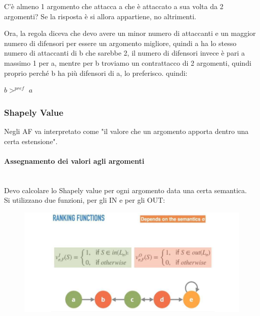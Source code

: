 \vspace{0.3cm}

\noindent C'è almeno 1 argomento che attacca a che è attaccato a sua volta
da 2 argomenti? Se la risposta è si allora appartiene, no altrimenti.

\vspace{0.3cm}

\noindent Ora, la regola diceva che devo avere un minor numero di attaccanti
e un maggior numero di difensori per essere un argomento migliore, quindi a
ha lo stesso numero di attaccanti di b che sarebbe 2, il numero di difensori
invece è pari a massimo 1 per a, mentre per b troviamo un contrattacco di 2
argomenti, quindi proprio perché b ha più difensori di a, lo preferisco.
quindi:
\begin{center}
    $b >^{pref}$ $a$
\end{center}
\subsubsection{Shapely Value}
Negli AF va interpretato come "il valore che un argomento apporta dentro una
certa estensione".
\paragraph{Assegnamento dei valori agli argomenti} \ \\
Devo calcolare lo Shapely value per ogni argomento data una certa semantica.
\\
Si utilizzano due funzioni, per gli IN e per gli OUT:
\begin{figure}[htp]
    \centering
    \includegraphics[width=13cm, keepaspectratio]{capitoli/img/Cap8/ordinamento-quantitativo.png}
\end{figure}

